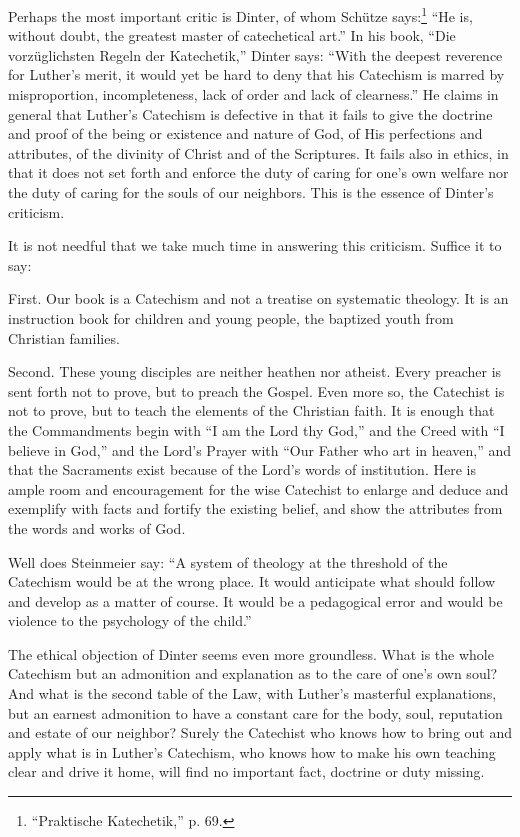  Perhaps the most important critic is Dinter, of whom Schütze says:\footnote{“Praktische Katechetik,” p. 69.} “He is, without doubt, the greatest master of catechetical art.” In his book, “Die vorzüglichsten Regeln der Katechetik,” Dinter says: “With the deepest reverence for Luther’s merit, it would yet be hard to deny that his Catechism is marred by misproportion, incompleteness, lack of order and lack of clearness.” He claims in general that Luther’s Catechism is defective in that it fails to give the doctrine and proof of the being or existence and nature of God, of His perfections and attributes, of the divinity of Christ and of the
 Scriptures. It fails also in ethics, in that it does not set forth and enforce the duty of caring for one’s own welfare nor the duty of caring for the souls of our neighbors. This is the essence of Dinter’s criticism.

It is not needful that we take much time in answering this criticism. Suffice it to say:

First. Our book is a Catechism and not a treatise on systematic theology. It is an instruction book for children and young people, the baptized youth from Christian families.

Second. These young disciples are neither heathen nor atheist. Every preacher is sent forth not to prove, but to preach the Gospel. Even more so,  the Catechist is not to prove, but to teach the elements of the Christian faith. It is enough that the Commandments begin with “I am the Lord thy God,” and the Creed with “I believe in God,” and the Lord’s Prayer with “Our Father who art in heaven,” and that the Sacraments exist because of the Lord’s words of institution. Here is ample room and encouragement for the wise Catechist to enlarge and deduce and exemplify with facts and fortify the existing belief, and show the attributes from the words and works of God.

Well does Steinmeier say: “A system of theology at the threshold of the Catechism would be at the wrong place. It would anticipate what should follow
and develop as a matter of course. It would be a pedagogical error and would be violence to the psychology of the child.”

The ethical objection of Dinter seems even more groundless. What is the whole Catechism but an admonition and explanation as to the care of one’s own soul? And what is the second table of the Law, with Luther’s masterful explanations, but an earnest admonition to have a constant care for the body, soul, reputation and estate of our neighbor? Surely the Catechist who knows how to bring out and apply what is in Luther’s Catechism, who knows how to make his own teaching clear and drive it home, will find no important fact, doctrine or duty missing.

